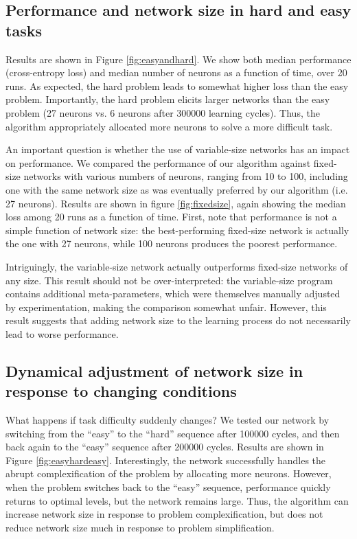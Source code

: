 \documentclass{article}
\begin{document}
\subsection{Performance and network size in hard and easy tasks}


Results are shown in Figure \ref{fig:easyandhard}. We show both median
performance (cross-entropy loss) and median number of neurons as a function of
time, over 20 runs. As expected, the hard problem leads to somewhat higher loss
than the easy problem. Importantly, the hard problem elicits larger networks
than the easy problem (27 neurons vs. 6 neurons after 300000 learning cycles).
Thus, the algorithm appropriately allocated more neurons to solve a more difficult
task.

An important question is whether the use of variable-size networks has an
impact on performance. We compared the performance of our algorithm against
fixed-size networks with various numbers of neurons, ranging from 10 to 100,
including one with the same network size as was eventually preferred by our
algorithm (i.e. 27 neurons).  Results are shown in figure \ref{fig:fixedsize},
again showing the median loss among 20 runs as a function of time. First, note
that performance is not a simple function of network size: the
best-performing fixed-size network is actually the one with 27 neurons, while
100 neurons 
produces the poorest performance.

Intriguingly, the variable-size network actually outperforms fixed-size
networks of any size.  This result should not be over-interpreted: the
variable-size program contains additional meta-parameters, which were
themselves manually adjusted by experimentation, making the comparison somewhat
unfair. However, this result suggests that adding network size to the learning
process do not necessarily lead to worse performance. 


\subsection{Dynamical adjustment of network size in response to changing conditions}

What happens if task difficulty suddenly changes? We tested our network by
 switching from the ``easy'' to the ``hard'' sequence after 100000
cycles, and then back again to the ``easy'' sequence after 200000 cycles.
Results are shown in Figure \ref{fig:easyhardeasy}. Interestingly, the network
successfully handles the abrupt complexification of the problem by allocating
more neurons. However, when the problem switches back to the ``easy'' sequence,
performance quickly returns to optimal levels, but the network remains large.
Thus, the algorithm can increase network size in response to problem
complexification, but does not reduce network size much in response to problem
simplification.
\end{document}
